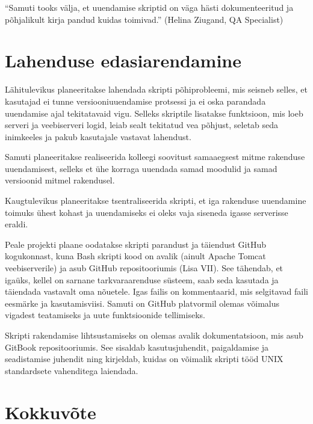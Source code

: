 \documentclass[12pt]{article}
\begin{document}
    \begin{displayquote}
    ``Samuti tooks välja, et uuendamise skriptid on väga hästi dokumenteeritud ja põhjalikult kirja pandud kuidas toimivad.'' (Helina Ziugand, QA Specialist)
    \end{displayquote}

  \newpage
  
  \section{Lahenduse edasiarendamine}
  
  Lähitulevikus planeeritakse lahendada skripti põhiprobleemi, mis seisneb selles, et kasutajad ei tunne versiooniuuendamise protsessi ja ei oska parandada uuendamise ajal tekitatavaid vigu. Selleks skriptile lisatakse funktsioon, mis loeb serveri ja veebiserveri logid, leiab sealt tekitatud vea põhjust, seletab seda inimkeeles ja pakub kasutajale vastavat lahendust.
  
  Samuti planeeritakse realiseerida kolleegi soovitust samaaegsest mitme rakenduse uuendamisest, selleks et ühe korraga uuendada samad moodulid ja samad versioonid mitmel rakendusel.
  
  Kaugtulevikus planeeritakse tsentraliseerida skripti, et iga rakenduse uuendamine toimuks ühest kohast ja uuendamiseks ei oleks vaja siseneda igasse serverisse eraldi.
  
  Peale projekti plaane oodatakse skripti parandust ja täiendust GitHub kogukonnast, kuna Bash skripti kood on avalik (ainult Apache Tomcat veebiserverile) ja asub GitHub repositooriumis (Lisa VII). See tähendab, et igaüks, kellel on sarnane tarkvaraarenduse süsteem, saab seda kasutada ja täiendada vastavalt oma nõuetele. Igas failis on kommentaarid, mis selgitavad faili eesmärke ja kasutamisviisi. Samuti on GitHub platvormil olemas võimalus vigadest teatamiseks ja uute funktsioonide tellimiseks.
  
  Skripti rakendamise lihtsustamiseks on olemas avalik dokumentatsioon, mis asub GitBook repositooriumis. See sisaldab kasutusjuhendit, paigaldamise ja seadistamise juhendit ning kirjeldab, kuidas on võimalik skripti tööd UNIX standardsete vahenditega laiendada.
  
  \newpage
  
  \section*{Kokkuvõte}
  \label{kokkuvote}
  
\end{document}

